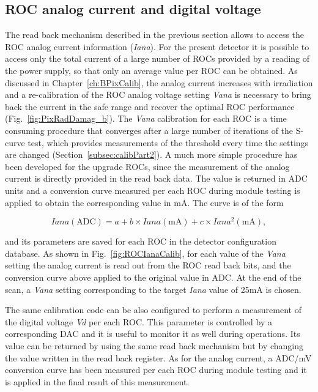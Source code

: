 \subsection{ROC analog current and digital voltage}

The read back mechanism described in the previous section allows to access the ROC analog current information (\textit{Iana}).
For the present detector it is possible to access only the total current of a large number of ROCs provided by a reading of the power supply, so that only an average value per ROC can be obtained.
As discussed in Chapter~\ref{ch:BPixCalib}, the analog current increases with irradiation and a re-calibration of the ROC analog voltage setting \textit{Vana}
is necessary to bring back the current in the safe range and recover the optimal ROC performance (Fig.~\ref{fig:PixRadDamag_b}).
The \textit{Vana} calibration for each ROC is a time consuming procedure that converges after a large number of iterations of the S-curve test,
which provides measurements of the threshold every time the settings are changed (Section~\ref{subsec:calibPart2}).
A much more simple procedure has been developed for the upgrade ROCs, since the measurement of the analog current is directly provided in the read back data.
The value is returned in ADC units and a conversion curve measured per each ROC during module testing is applied to obtain the corresponding value in mA.
The curve is of the form

\begin{equation}
Iana (\mathrm{ADC}) = a + b \times Iana (\mathrm{mA}) + c \times Iana^2 (\mathrm{mA}),
\end{equation}

and its parameters are saved for each ROC in the detector configuration database.
As shown in Fig.~\ref{fig:ROCIanaCalib}, for each value of the \textit{Vana} setting the analog current is read out from the ROC read back bits,
and the conversion curve above applied to the original value in ADC.
At the end of the scan, a \textit{Vana} setting corresponding to the target \textit{Iana} value of 25\unit{mA} is chosen.

The same calibration code can be also configured to perform a measurement of the digital voltage \textit{Vd} per each ROC.
This parameter is controlled by a corresponding DAC and it is useful to monitor it as well during operations.
Its value can be returned by using the same read back mechanism but by changing the value written in the read back register.
As for the analog current, a ADC/mV conversion curve has been measured per each ROC during module testing
and it is applied in the final result of this measurement.

